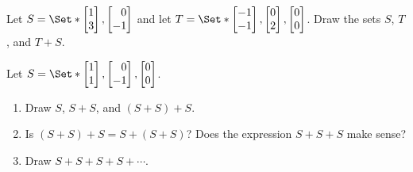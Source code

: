 \begin{exercises}
\begin{problist}
\begin{solution}
		\end{solution}
		
		\prob Let $S=$ and let $T=$. Draw
		the sets $S$, $T$, and $T+S$.
		
		\prob Let $S=$. 
		\begin{enumerate}
			\item 
			Draw $S$, $S+S$, and $(S+S)+S$.
			\item Is $(S+S)+S=S+(S+S)$? Does the expression $S+S+S$ make sense?
			\item Draw $S+S+S+S+\cdots$.
		\end{enumerate}
		

\end{problist}
\end{exercises}
